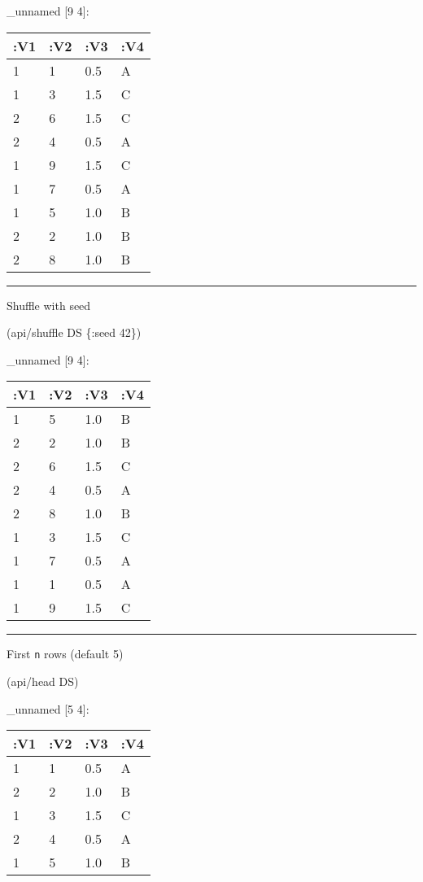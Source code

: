 \documentclass[]{article}
\newenvironment{Shaded}{\begin{snugshade}}{\end{snugshade}}
\newcommand{\AttributeTok}[1]{\textcolor[rgb]{0.77,0.63,0.00}{#1}}
\newcommand{\DecValTok}[1]{\textcolor[rgb]{0.00,0.00,0.81}{#1}}
\newcommand{\NormalTok}[1]{#1}
\begin{document}
\_unnamed {[}9 4{]}:

\begin{longtable}[]{@{}llll@{}}
\toprule
:V1 & :V2 & :V3 & :V4\tabularnewline
\midrule
\endhead
1 & 1 & 0.5 & A\tabularnewline
1 & 3 & 1.5 & C\tabularnewline
2 & 6 & 1.5 & C\tabularnewline
2 & 4 & 0.5 & A\tabularnewline
1 & 9 & 1.5 & C\tabularnewline
1 & 7 & 0.5 & A\tabularnewline
1 & 5 & 1.0 & B\tabularnewline
2 & 2 & 1.0 & B\tabularnewline
2 & 8 & 1.0 & B\tabularnewline
\bottomrule
\end{longtable}

\begin{center}\rule{0.5\linewidth}{0.5pt}\end{center}

Shuffle with seed

\begin{Shaded}
\begin{Highlighting}[]
\NormalTok{(api/shuffle DS \{}\AttributeTok{:seed} \DecValTok{42}\NormalTok{\})}
\end{Highlighting}
\end{Shaded}

\_unnamed {[}9 4{]}:

\begin{longtable}[]{@{}llll@{}}
\toprule
:V1 & :V2 & :V3 & :V4\tabularnewline
\midrule
\endhead
1 & 5 & 1.0 & B\tabularnewline
2 & 2 & 1.0 & B\tabularnewline
2 & 6 & 1.5 & C\tabularnewline
2 & 4 & 0.5 & A\tabularnewline
2 & 8 & 1.0 & B\tabularnewline
1 & 3 & 1.5 & C\tabularnewline
1 & 7 & 0.5 & A\tabularnewline
1 & 1 & 0.5 & A\tabularnewline
1 & 9 & 1.5 & C\tabularnewline
\bottomrule
\end{longtable}

\begin{center}\rule{0.5\linewidth}{0.5pt}\end{center}

First \texttt{n} rows (default 5)

\begin{Shaded}
\begin{Highlighting}[]
\NormalTok{(api/head DS)}
\end{Highlighting}
\end{Shaded}

\_unnamed {[}5 4{]}:

\begin{longtable}[]{@{}llll@{}}
\toprule
:V1 & :V2 & :V3 & :V4\tabularnewline
\midrule
\endhead
1 & 1 & 0.5 & A\tabularnewline
2 & 2 & 1.0 & B\tabularnewline
1 & 3 & 1.5 & C\tabularnewline
2 & 4 & 0.5 & A\tabularnewline
1 & 5 & 1.0 & B\tabularnewline
\bottomrule
\end{longtable}
\end{document}
